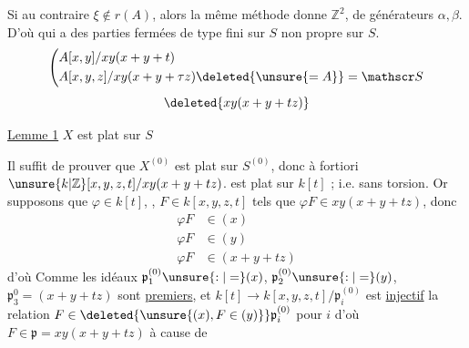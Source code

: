  Si au contraire $\xi\notin r(A)$, alors la même méthode donne  $\mathbb Z^2$, de générateurs $\alpha,\beta$. D'où   qui a des parties fermées de type fini sur $S$ non propre sur $S$.
\[
\left(\begin{aligned}
&A[x,y]/xy(x+y+t)\\
&A[x,y,z]/xy(x+y+\tau z)\deleted{\unsure{=A}}=\mathscr S
\end{aligned}\right.
\]
\[
\deleted{xy(x+y+tz)}
\]

\uline{Lemme 1} $X$ est plat sur $S$

Il suffit de prouver que $X^{(0)}$ est plat sur $S^{(0)}$, donc à fortiori  $\unsure{k|\mathbb Z}[x,y,z,t]/xy(x+y+tz)$. est plat sur $k[t]$ ;  i.e. sans torsion. Or supposons que $\varphi\in k[t]$, , $F\in k[x,y,z,t]$ tels que $\varphi F\in xy(x+y+tz)$, donc
\[
\begin{aligned}
\varphi F&\in(x)\\
\varphi F&\in(y)\\
\varphi F&\in(x+y+tz)
\end{aligned}
\]
d'où Comme  les idéaux  $\mathfrak p_1^{(0)}\unsure{:|=}(x)$, $\mathfrak p_2^{(0)}\unsure{:|=}(y)$, $\mathfrak p_3^{0}=(x+y+tz)$ sont  \uline{premiers}, et $k[t]\longrightarrow k[x,y,z,t]/\mathfrak p_i^{(0)}$ est \uline{injectif}  la relation $F\in\deleted{\unsure{(x), F\in(y)}}\mathfrak p_i^{(0)}$ pour  $i$  d'où $F\in\mathfrak p=xy(x+y+tz)$ à cause de

